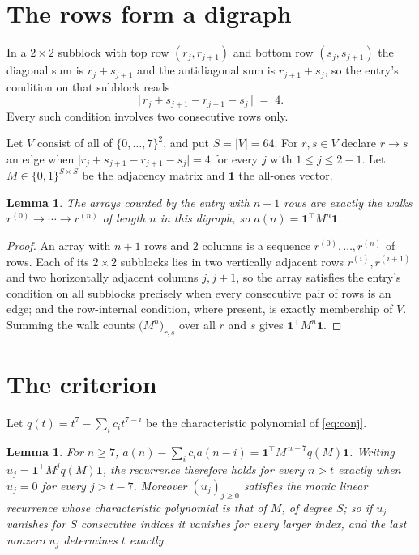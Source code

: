 \documentclass[11pt,a4paper]{article}
\theoremstyle{plain}
\newtheorem{lemma}[theorem]{Lemma}
\theoremstyle{definition}
\begin{document}
\section{The rows form a digraph}

In a $2\times2$ subblock with top row $(r_j,r_{j+1})$ and bottom row $(s_j,s_{j+1})$ the
diagonal sum is $r_j+s_{j+1}$ and the antidiagonal sum is $r_{j+1}+s_j$, so the entry's
condition on that subblock reads
\[
\bigl|\,r_j+s_{j+1}-r_{j+1}-s_j\,\bigr|\;=\;4.
\]
Every such condition involves two consecutive rows only.

Let $V$ consist of all of $\{0,\dots,7\}^{2}$, and put $S=|V|=64$. For $r,s\in V$ declare $r\to s$ an edge
when $\bigl|r_j+s_{j+1}-r_{j+1}-s_j\bigr|=4$ for every $j$ with
$1\le j\le2-1$. Let $M\in\{0,1\}^{S\times S}$ be the adjacency matrix and $\mathbf{1}$
the all-ones vector.

\begin{lemma}\label{lem:walk}
The arrays counted by the entry with $n+1$ rows are exactly the walks
$r^{(0)}\to\cdots\to r^{(n)}$ of length $n$ in this digraph, so
$a(n)=\mathbf{1}^{\!\top}M^{n}\mathbf{1}$.
\end{lemma}

\begin{proof}
An array with $n+1$ rows and $2$ columns is a sequence $r^{(0)},\dots,r^{(n)}$ of
rows. Each of its $2\times2$ subblocks lies in two vertically adjacent rows
$r^{(i)},r^{(i+1)}$ and two horizontally adjacent columns $j,j+1$, so the array satisfies
the entry's condition on all subblocks precisely when every consecutive pair of rows is an
edge; and the row-internal condition, where present, is exactly membership of $V$. Summing
the walk counts $\bigl(M^{n}\bigr)_{r,s}$ over all $r$ and $s$ gives
$\mathbf{1}^{\!\top}M^{n}\mathbf{1}$.
\end{proof}

\section{The criterion}

Let $q(t)=t^{7}-\sum_i c_i t^{7-i}$ be the characteristic polynomial of
\eqref{eq:conj}.

\begin{lemma}\label{lem:crit}
For $n\ge7$,
$a(n)-\sum_i c_i a(n-i)=\mathbf{1}^{\!\top}M^{\,n-7}q(M)\mathbf{1}$. Writing
$u_j=\mathbf{1}^{\!\top}M^{j}q(M)\mathbf{1}$, the recurrence therefore holds for every
$n>t$ exactly when $u_j=0$ for every $j>t-7$. Moreover $(u_j)_{j\ge0}$ satisfies the
monic linear recurrence whose characteristic polynomial is that of $M$, of degree $S$; so
if $u_j$ vanishes for $S$ consecutive indices it vanishes for every larger index, and the
last nonzero $u_j$ determines $t$ exactly.
\end{lemma}
\end{document}

